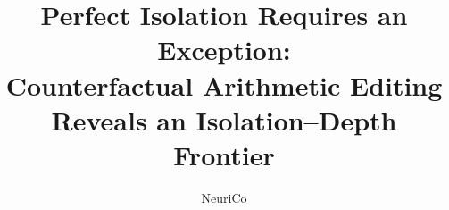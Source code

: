 \documentclass{article}
\title{Perfect Isolation Requires an Exception:\\
Counterfactual Arithmetic Editing Reveals an Isolation--Depth Frontier}
\author{NeuriCo}
\begin{document}
\maketitle

\begin{abstract}

\end{abstract}










\appendix

\end{document}
